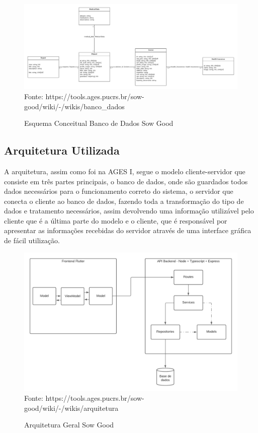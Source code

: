 \begin{figure}[H]
    \centering
    \small
    \caption{Esquema Conceitual Banco de Dados Sow Good}
    \includegraphics[width=1\linewidth]{conteudo//3 - ages II//conteudo//figures//bd-conceitual.png}
    Fonte: https://tools.ages.pucrs.br/sow-good/wiki/-/wikis/banco\_dados
\end{figure}

\subsection{Arquitetura Utilizada}
A arquitetura, assim como foi na AGES I, segue o modelo cliente-servidor 
que consiste em três partes principais, o banco de dados, onde são guardados todos 
dados necessários para o funcionamento correto do sistema, o servidor que conecta 
o cliente ao banco de dados, fazendo toda a transformação do tipo de dados e 
tratamento necessários, assim devolvendo uma informação utilizável pelo cliente que 
é a última parte do modelo e o cliente, que é responsável por apresentar as informações recebidas do servidor através de uma interface gráfica de fácil utilização.

\begin{figure}[H]
    \centering
    \small
    \caption{Arquitetura Geral Sow Good}
    \includegraphics[width=1\linewidth]{conteudo//3 - ages II//conteudo//figures//arquitetura-geral.png}
    Fonte: https://tools.ages.pucrs.br/sow-good/wiki/-/wikis/arquitetura
\end{figure}


